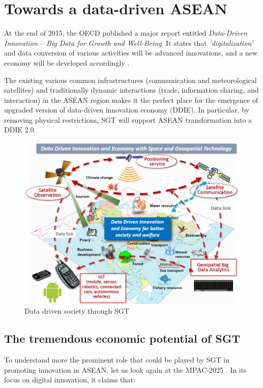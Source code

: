 \section{Towards a data-driven ASEAN}

\tab At the end of 2015, the OECD published a major report entitled \textit{Data-Driven Innovation -- Big Data for Growth and Well-Being}. It states that \textit{'digitalization'} and data conversion of various activities will be advanced innovations, and a new economy will be developed accordingly \cite{oecd_ddi}.

The existing various common infrastructures (communication and meteorological satellites) and traditionally dynamic interactions (trade, information sharing, and interaction) in the ASEAN region makes it the perfect place for the emergence of upgraded version of data-driven innovation economy (DDIE). In particular, by removing physical restrictions, SGT will support ASEAN transformation into a DDIE 2.0.

\begin{figure}[H]
\begin{center}
\includegraphics[width = 0.8\linewidth]{Figures/data_driven.png}
\end{center}
\caption{Data driven society through SGT}
\label{data_driven}
\end{figure}

\subsection{The tremendous economic potential of SGT}

\tab To understand more the prominent role that could be played by SGT in promoting innovation in ASEAN, let us look again at the MPAC-2025 \cite{mpac}. In its focus on digital innovation, it claims that:

